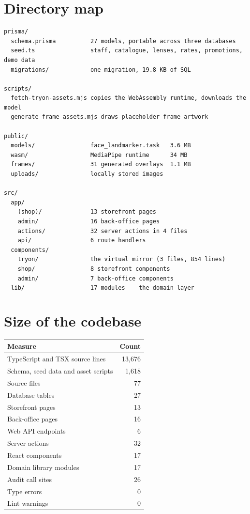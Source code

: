 \documentclass[11pt,a4paper]{report}
\begin{document}
\section{Directory map}

\begin{lstlisting}
prisma/
  schema.prisma          27 models, portable across three databases
  seed.ts                staff, catalogue, lenses, rates, promotions, demo data
  migrations/            one migration, 19.8 KB of SQL

scripts/
  fetch-tryon-assets.mjs copies the WebAssembly runtime, downloads the model
  generate-frame-assets.mjs draws placeholder frame artwork

public/
  models/                face_landmarker.task   3.6 MB
  wasm/                  MediaPipe runtime      34 MB
  frames/                31 generated overlays  1.1 MB
  uploads/               locally stored images

src/
  app/
    (shop)/              13 storefront pages
    admin/               16 back-office pages
    actions/             32 server actions in 4 files
    api/                 6 route handlers
  components/
    tryon/               the virtual mirror (3 files, 854 lines)
    shop/                8 storefront components
    admin/               7 back-office components
  lib/                   17 modules -- the domain layer
\end{lstlisting}

\section{Size of the codebase}

\begin{center}
\begin{tabular}{@{}lr@{}}
\toprule
\textbf{Measure} & \textbf{Count}\\
\midrule
TypeScript and TSX source lines & 13{,}676\\
Schema, seed data and asset scripts & 1{,}618\\
Source files & 77\\
Database tables & 27\\
Storefront pages & 13\\
Back-office pages & 16\\
Web API endpoints & 6\\
Server actions & 32\\
React components & 17\\
Domain library modules & 17\\
Audit call sites & 26\\
Type errors & 0\\
Lint warnings & 0\\
\bottomrule
\end{tabular}
\end{center}
\end{document}
